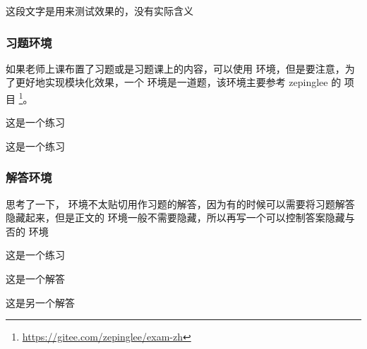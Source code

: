 \documentclass{xdyy-usermanual}
\begin{document}
\begin{vexample}
    \begin{detail}[
      book = {《泛函分析讲义》},  %
      page = {103},               %
      author = {许全华},          %
      edition = {第一版},         %
      year = {2017},              %
      line = {倒数第三行},        %
      original = {                %
        ...
      }
    ]
      这段文字是用来测试效果的，没有实际含义
    \end{detail}
\end{vexample}



\subsubsection{ 习题环境  }

如果老师上课布置了习题或是习题课上的内容，可以使用  环境，但是要注意，为了更好地实现模块化效果，一个  环境是一道题，该环境主要参考 zepinglee 的  项目 \footnote{ \url{https://gitee.com/zepinglee/exam-zh}}。

\begin{vexample}
    \begin{exercise}[title = {title测试}]
      这是一个练习
    \end{exercise}

    \begin{exercise}
      这是一个练习
    \end{exercise}
\end{vexample}



\subsubsection{ 解答环境  }

思考了一下， 环境不太贴切用作习题的解答，因为有的时候可以需要将习题解答隐藏起来，但是正文的  环境一般不需要隐藏，所以再写一个可以控制答案隐藏与否的  环境

\begin{vexample}
    \begin{exercise}
      这是一个练习
    \end{exercise}

    \begin{answer}
      这是一个解答
    \end{answer}

    \begin{answer}[title = {解答title}]
      这是另一个解答
    \end{answer}
\end{vexample}
\end{document}
